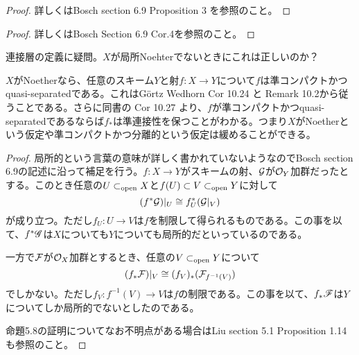 
\begin{proof}
  詳しくはBosch\cite{Bosch} section 6.9 Proposition 3 を参照のこと。
\end{proof}


\begin{proof}
  詳しくはBosch\cite{Bosch} Section 6.9 Cor.4を参照のこと。
\end{proof}


\begin{rem}
  連接層の定義に疑問。$X$が局所Noehterでないときにこれは正しいのか？
\end{rem}


\begin{rem}
  $X$がNoetherなら、任意のスキーム$Y$と射$f \colon X \to Y$について$f$は準コンパクトかつquasi-separatedである。これはG\"ortz Wedhorn\cite{GW} Cor 10.24 と Remark 10.2から従うことである。さらに同書の Cor 10.27 より、$f$が準コンパクトかつquasi-separatedであるならば$f_*$は準連接性を保つことがわかる。つまり$X$がNoetherという仮定や準コンパクトかつ分離的という仮定は緩めることができる。
\end{rem}


\begin{proof}
局所的という言葉の意味が詳しく書かれていないようなのでBosch\cite{Bosch} section 6.9の記述に沿って補足を行う。$f \colon X \to Y$がスキームの射、$\mathcal{G}$が$\mathcal{O}_Y$加群だったとする。このとき任意の$U \subset_{\text{open}} X$と$f(U) \subset V \subset_{\text{open}} Y$に対して
\[
(f^* \mathcal{G})|_U \cong f^*_U(\mathcal{G}|_V)
\]
が成り立つ。ただし$f_U \colon U \to V$は$f$を制限して得られるものである。この事を以て、$f^*\mathscr{G}$は$X$についても$Y$についても局所的だといっているのである。

一方で$\mathcal{F}$が$\mathcal{O}_X$加群とするとき、任意の$V \subset_{\text{open}} Y$について
\[
(f_* \mathcal{F})|_V \cong (f_V)_* (\mathcal{F}_{f^{-1}(V)})
\]
でしかない。ただし$f_V \colon f^{-1}(V) \to V$は$f$の制限である。この事を以て、$f_*  \mathscr{F}$は$Y$についてしか局所的でないとしたのである。

命題5.8の証明についてなお不明点がある場合はLiu\cite{Liu} section 5.1 Proposition 1.14も参照のこと。
\end{proof}




